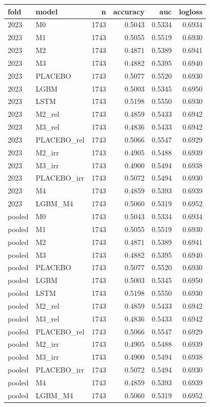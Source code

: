 \begin{tabular}{llrrrr}
\toprule
fold & model & n & accuracy & auc & logloss \\
\midrule
2023 & M0 & 1743 & 0.5043 & 0.5334 & 0.6934 \\
2023 & M1 & 1743 & 0.5055 & 0.5519 & 0.6930 \\
2023 & M2 & 1743 & 0.4871 & 0.5389 & 0.6941 \\
2023 & M3 & 1743 & 0.4882 & 0.5395 & 0.6940 \\
2023 & PLACEBO & 1743 & 0.5077 & 0.5520 & 0.6930 \\
2023 & LGBM & 1743 & 0.5003 & 0.5345 & 0.6950 \\
2023 & LSTM & 1743 & 0.5198 & 0.5550 & 0.6930 \\
2023 & M2\_rel & 1743 & 0.4859 & 0.5433 & 0.6942 \\
2023 & M3\_rel & 1743 & 0.4836 & 0.5433 & 0.6942 \\
2023 & PLACEBO\_rel & 1743 & 0.5066 & 0.5547 & 0.6929 \\
2023 & M2\_irr & 1743 & 0.4905 & 0.5488 & 0.6939 \\
2023 & M3\_irr & 1743 & 0.4900 & 0.5494 & 0.6938 \\
2023 & PLACEBO\_irr & 1743 & 0.5072 & 0.5494 & 0.6930 \\
2023 & M4 & 1743 & 0.4859 & 0.5393 & 0.6939 \\
2023 & LGBM\_M4 & 1743 & 0.5060 & 0.5319 & 0.6952 \\
pooled & M0 & 1743 & 0.5043 & 0.5334 & 0.6934 \\
pooled & M1 & 1743 & 0.5055 & 0.5519 & 0.6930 \\
pooled & M2 & 1743 & 0.4871 & 0.5389 & 0.6941 \\
pooled & M3 & 1743 & 0.4882 & 0.5395 & 0.6940 \\
pooled & PLACEBO & 1743 & 0.5077 & 0.5520 & 0.6930 \\
pooled & LGBM & 1743 & 0.5003 & 0.5345 & 0.6950 \\
pooled & LSTM & 1743 & 0.5198 & 0.5550 & 0.6930 \\
pooled & M2\_rel & 1743 & 0.4859 & 0.5433 & 0.6942 \\
pooled & M3\_rel & 1743 & 0.4836 & 0.5433 & 0.6942 \\
pooled & PLACEBO\_rel & 1743 & 0.5066 & 0.5547 & 0.6929 \\
pooled & M2\_irr & 1743 & 0.4905 & 0.5488 & 0.6939 \\
pooled & M3\_irr & 1743 & 0.4900 & 0.5494 & 0.6938 \\
pooled & PLACEBO\_irr & 1743 & 0.5072 & 0.5494 & 0.6930 \\
pooled & M4 & 1743 & 0.4859 & 0.5393 & 0.6939 \\
pooled & LGBM\_M4 & 1743 & 0.5060 & 0.5319 & 0.6952 \\
\bottomrule
\end{tabular}
